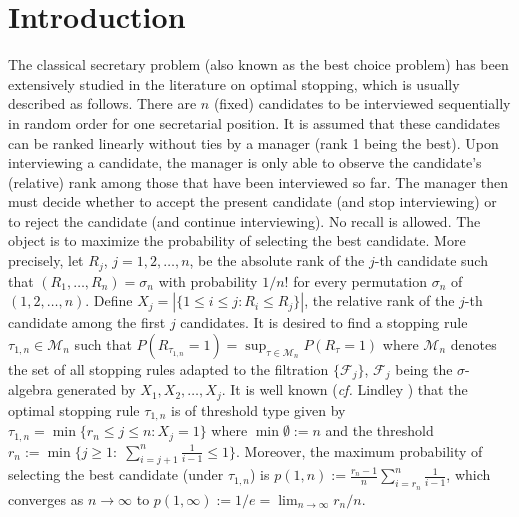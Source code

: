 \documentclass[12pt, A4paper, oneside]{article}
\theoremstyle{plain}
\numberwithin{equation}{section}
\begin{document}
\section{Introduction}
\hspace*{18pt}The classical secretary problem (also known as the best choice problem) has been extensively studied in the literature on optimal stopping, which is usually described as follows. There are $n$ (fixed) candidates to be interviewed sequentially in  random order for one secretarial position. It is assumed that these candidates can be ranked linearly without ties by a manager (rank 1 being the best). Upon interviewing a candidate, the manager is only able to observe the candidate's (relative) rank among those that have been interviewed so far.
The manager then  must decide whether to accept the present candidate (and stop interviewing) or to reject the candidate (and continue
 interviewing). No recall is allowed. The object is to maximize the probability of selecting the best candidate. More precisely, let $R_j$, $j=1,2,\ldots,n$, be the absolute rank of the $j$-th candidate
such that $(R_1,\dots,R_n)=\sigma_n$ with probability $1/n!$ for every permutation $\sigma_n$ of $(1,2,\dots,n)$.
Define $X_j=|\{1\le i \le j: R_i \le R_j\}|$, the relative rank of the $j$-th candidate among the first $j$ candidates.
It is desired to find a stopping rule $\tau_{1,n}\in \mathcal{M}_n$ such that
$P(R_{\tau_{1,n}}=1)=\sup_{\tau\in \mathcal{M}_n}P(R_{\tau}=1)$
where $\mathcal{M}_n$ denotes the set of all  stopping rules adapted to the filtration $\{\mathcal{F}_j\}$,
$\mathcal{F}_j$ being  the $\sigma$-algebra generated by $X_1,X_2,\dots,X_j$. It is well known ({\it cf.} Lindley \cite{ref10}) that the optimal stopping rule $\tau_{1,n}$ is of threshold type given by
$\tau_{1,n}=\min\{r_n\le j \le n: X_j=1\}$ where  $\min \emptyset:=n$ and the threshold
 $r_n:=\min\{j\ge1:\;\sum_{i=j+1}^n\frac{1}{i-1}\le1\}$.
 Moreover, the maximum probability of selecting the best candidate (under $\tau_{1,n}$) is
$p(1,n):=\frac{r_n-1}{n}\sum_{i=r_n}^n\frac{1}{i-1}$,
which converges as $n \to \infty$ to $p(1,\infty):=1/e=\lim_{n \to \infty} r_n/n$.
\end{document}

